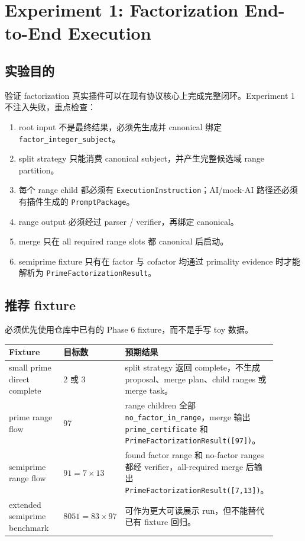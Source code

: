 \documentclass[11pt]{ctexart}
\begin{document}
\section{Experiment 1: Factorization End-to-End Execution}

\subsection{实验目的}

验证 factorization 真实插件可以在现有协议核心上完成完整闭环。Experiment 1 不注入失败，重点检查：

\begin{enumerate}[leftmargin=2em]
  \item root input 不是最终结果，必须先生成并 canonical 绑定 \texttt{factor\_integer\_subject}。
  \item split strategy 只能消费 canonical subject，并产生完整候选域 range partition。
  \item 每个 range child 都必须有 \texttt{ExecutionInstruction}；AI/mock-AI 路径还必须有插件生成的 \texttt{PromptPackage}。
  \item range output 必须经过 parser / verifier，再绑定 canonical。
  \item merge 只在 all required range slots 都 canonical 后启动。
  \item semiprime fixture 只有在 factor 与 cofactor 均通过 primality evidence 时才能解析为 \texttt{PrimeFactorizationResult}。
\end{enumerate}

\subsection{推荐 fixture}

必须优先使用仓库中已有的 Phase 6 fixture，而不是手写 toy 数据。

\begin{longtable}{p{0.22\linewidth}p{0.2\linewidth}p{0.48\linewidth}}
\toprule
Fixture & 目标数 & 预期结果 \\
\midrule
small prime direct complete & 2 或 3 & split strategy 返回 complete，不生成 proposal、merge plan、child ranges 或 merge task。 \\
prime range flow & 97 & range children 全部 \texttt{no\_factor\_in\_range}，merge 输出 \texttt{prime\_certificate} 和 \texttt{PrimeFactorizationResult([97])}。 \\
semiprime range flow & $91 = 7 \times 13$ & found factor range 和 no-factor ranges 都经 verifier，all-required merge 后输出 \texttt{PrimeFactorizationResult([7,13])}。 \\
extended semiprime benchmark & $8051 = 83 \times 97$ & 可作为更大可读展示 run，但不能替代已有 fixture 回归。 \\
\bottomrule
\end{longtable}
\end{document}
